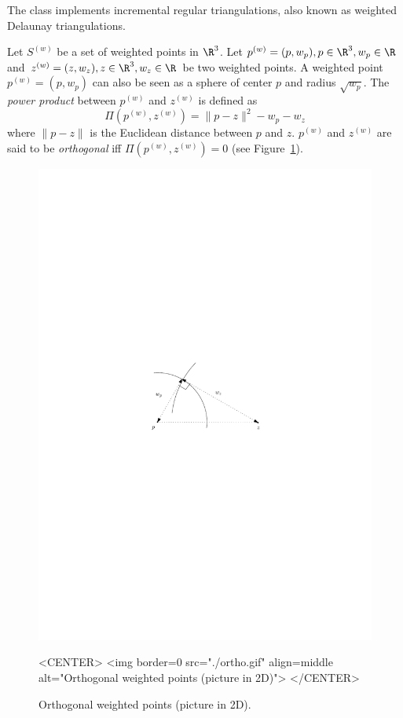 The class  implements incremental regular
triangulations, also known as weighted Delaunay triangulations.

Let ${S}^{(w)}$ be a set of weighted points in $\R^3$. Let
${p}^{(w)}=(p,w_p), p\in\R^3, w_p\in\R$ and 
${z}^{(w)}=(z,w_z), z\in\R^3, w_z\in\R$ be two weighted points. 
A weighted point
${p}^{(w)}=(p,w_p)$ can also be seen as a sphere of center $p$ and
radius $\sqrt{w_p}$. 
The \textit{power product} between ${p}^{(w)}$ and ${z}^{(w)}$ is
defined as 
\[\Pi({p}^{(w)},{z}^{(w)}) = {\|{p-z}\|^2-w_p-w_z}\]
where $\|{p-z}\|$ is the Euclidean distance between $p$ and $z$. 
 ${p}^{(w)}$ and ${z}^{(w)}$
are said to be \textit{orthogonal} iff $\Pi{({p}^{(w)},{z}^{(w)})}
= 0$ (see Figure~\ref{Triangulation3-fig-ortho}).

\begin{figure}[htbp]
\begin{ccTexOnly}
\begin{center} 
\includegraphics{Triangulation_3/ortho} 
\end{center}
\end{ccTexOnly}
\begin{ccHtmlOnly}
<CENTER>
<img border=0 src="./ortho.gif" align=middle alt="Orthogonal weighted
points (picture in 2D)"> 
</CENTER>
\end{ccHtmlOnly}
\caption{Orthogonal weighted points (picture in 2D).
\label{Triangulation3-fig-ortho}}
\end{figure} 


